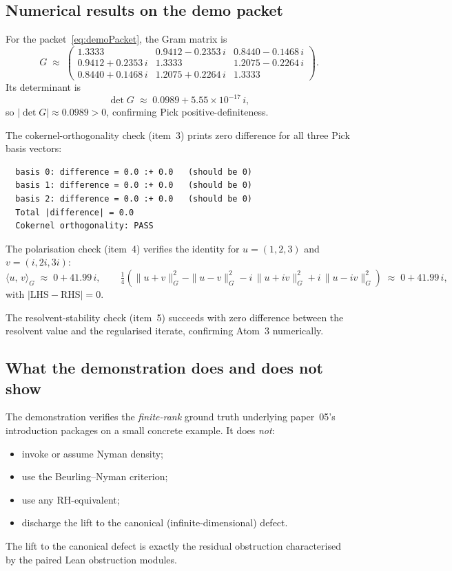 \documentclass[12pt]{article}
\theoremstyle{definition}
\theoremstyle{remark}
\newcommand{\inn}[2]{\langle #1,\, #2 \rangle}
\begin{document}
\subsection{Numerical results on the demo packet}

For the packet~\eqref{eq:demoPacket}, the Gram matrix is
\begin{equation}\label{eq:demoGram}
  G \;\approx\;
  \begin{pmatrix}
    1.3333 & 0.9412 - 0.2353\,i & 0.8440 - 0.1468\,i \\
    0.9412 + 0.2353\,i & 1.3333 & 1.2075 - 0.2264\,i \\
    0.8440 + 0.1468\,i & 1.2075 + 0.2264\,i & 1.3333
  \end{pmatrix}.
\end{equation}
Its determinant is
\begin{equation}\label{eq:demoDet}
  \det G \;\approx\; 0.0989 + 5.55 \times 10^{-17}\,i,
\end{equation}
so $|\det G| \approx 0.0989 > 0$, confirming Pick positive-definiteness.

The cokernel-orthogonality check (item~3) prints zero difference for all three Pick basis vectors:
\begin{verbatim}
  basis 0: difference = 0.0 :+ 0.0   (should be 0)
  basis 1: difference = 0.0 :+ 0.0   (should be 0)
  basis 2: difference = 0.0 :+ 0.0   (should be 0)
  Total |difference| = 0.0
  Cokernel orthogonality: PASS
\end{verbatim}

The polarisation check (item~4) verifies the identity for $u = (1, 2, 3)$ and $v = (i, 2i, 3i)$:
\begin{equation}\label{eq:demoPol}
  \inn{u}{v}_{G}
    \;\approx\; 0 + 41.99\,i,
  \qquad
  \tfrac{1}{4}(\|u + v\|_{G}^{2} - \|u - v\|_{G}^{2} - i\,\|u + iv\|_{G}^{2} + i\,\|u - iv\|_{G}^{2})
    \;\approx\; 0 + 41.99\,i,
\end{equation}
with $|\mathrm{LHS} - \mathrm{RHS}| = 0$.

The resolvent-stability check (item~5) succeeds with zero difference between the resolvent value and the regularised iterate, confirming Atom~3 numerically.

\subsection{What the demonstration does and does not show}

The demonstration verifies the \emph{finite-rank} ground truth underlying paper~05's introduction packages on a small concrete example. It does \emph{not}:
\begin{itemize}
  \item invoke or assume Nyman density;
  \item use the Beurling--Nyman criterion;
  \item use any RH-equivalent;
  \item discharge the lift to the canonical (infinite-dimensional) defect.
\end{itemize}
The lift to the canonical defect is exactly the residual obstruction characterised by the paired Lean obstruction modules.
\end{document}
